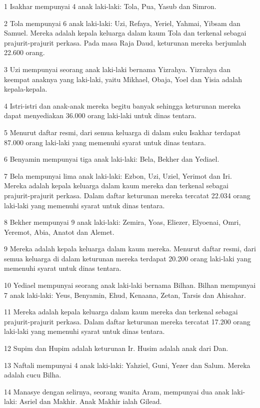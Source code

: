 \par 1 Isakhar mempunyai 4 anak laki-laki: Tola, Pua, Yasub dan Simron.
\par 2 Tola mempunyai 6 anak laki-laki: Uzi, Refaya, Yeriel, Yahmai, Yibsam dan Samuel. Mereka adalah kepala keluarga dalam kaum Tola dan terkenal sebagai prajurit-prajurit perkasa. Pada masa Raja Daud, keturunan mereka berjumlah 22.600 orang.
\par 3 Uzi mempunyai seorang anak laki-laki bernama Yizrahya. Yizrahya dan keempat anaknya yang laki-laki, yaitu Mikhael, Obaja, Yoel dan Yisia adalah kepala-kepala.
\par 4 Istri-istri dan anak-anak mereka begitu banyak sehingga keturunan mereka dapat menyediakan 36.000 orang laki-laki untuk dinas tentara.
\par 5 Menurut daftar resmi, dari semua keluarga di dalam suku Isakhar terdapat 87.000 orang laki-laki yang memenuhi syarat untuk dinas tentara.
\par 6 Benyamin mempunyai tiga anak laki-laki: Bela, Bekher dan Yediael.
\par 7 Bela mempunyai lima anak laki-laki: Ezbon, Uzi, Uziel, Yerimot dan Iri. Mereka adalah kepala keluarga dalam kaum mereka dan terkenal sebagai prajurit-prajurit perkasa. Dalam daftar keturunan mereka tercatat 22.034 orang laki-laki yang memenuhi syarat untuk dinas tentara.
\par 8 Bekher mempunyai 9 anak laki-laki: Zemira, Yoas, Eliezer, Elyoenai, Omri, Yeremot, Abia, Anatot dan Alemet.
\par 9 Mereka adalah kepala keluarga dalam kaum mereka. Menurut daftar resmi, dari semua keluarga di dalam keturunan mereka terdapat 20.200 orang laki-laki yang memenuhi syarat untuk dinas tentara.
\par 10 Yediael mempunyai seorang anak laki-laki bernama Bilhan. Bilhan mempunyai 7 anak laki-laki: Yeus, Benyamin, Ehud, Kenaana, Zetan, Tarsis dan Ahisahar.
\par 11 Mereka adalah kepala keluarga dalam kaum mereka dan terkenal sebagai prajurit-prajurit perkasa. Dalam daftar keturunan mereka tercatat 17.200 orang laki-laki yang memenuhi syarat untuk dinas tentara.
\par 12 Supim dan Hupim adalah keturunan Ir. Husim adalah anak dari Dan.
\par 13 Naftali mempunyai 4 anak laki-laki: Yahziel, Guni, Yezer dan Salum. Mereka adalah cucu Bilha.
\par 14 Manasye dengan selirnya, seorang wanita Aram, mempunyai dua anak laki-laki: Asriel dan Makhir. Anak Makhir ialah Gilead.
